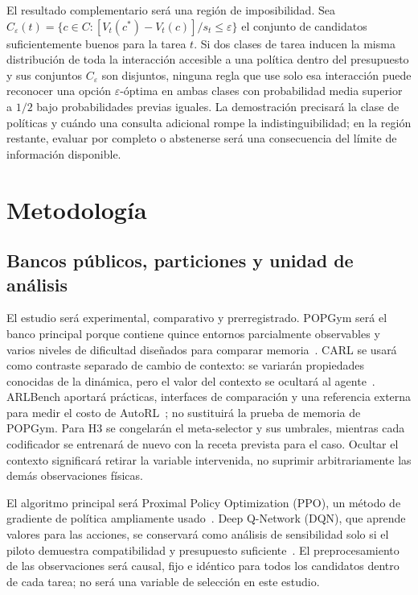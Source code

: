 \documentclass[11pt,letterpaper]{article}
\newcommand{\Vt}{V_t}
\newcommand{\cstar}{c^*}
\begin{document}
El resultado complementario será una región de imposibilidad.
Sea $C_{\varepsilon}(t)=\{c\in C:[\Vt(\cstar)-\Vt(c)]/s_t\leq\varepsilon\}$ el conjunto de candidatos suficientemente buenos para la tarea $t$.
Si dos clases de tarea inducen la misma distribución de toda la interacción accesible a una política dentro del presupuesto y sus conjuntos $C_{\varepsilon}$ son disjuntos, ninguna regla que use solo esa interacción puede reconocer una opción $\varepsilon$-óptima en ambas clases con probabilidad media superior a $1/2$ bajo probabilidades previas iguales.
La demostración precisará la clase de políticas y cuándo una consulta adicional rompe la indistinguibilidad; en la región restante, evaluar por completo o abstenerse será una consecuencia del límite de información disponible.

\section{Metodología}

\subsection{Bancos públicos, particiones y unidad de análisis}

El estudio será experimental, comparativo y prerregistrado.
POPGym será el banco principal porque contiene quince entornos parcialmente observables y varios niveles de dificultad diseñados para comparar memoria~\cite{morad2023popgym}.
CARL se usará como contraste separado de cambio de contexto: se variarán propiedades conocidas de la dinámica, pero el valor del contexto se ocultará al agente~\cite{benjamins2023carl}.
ARLBench aportará prácticas, interfaces de comparación y una referencia externa para medir el costo de AutoRL~\cite{becktepe2026arlbench}; no sustituirá la prueba de memoria de POPGym.
Para H3 se congelarán el meta-selector y sus umbrales, mientras cada codificador se entrenará de nuevo con la receta prevista para el caso.
Ocultar el contexto significará retirar la variable intervenida, no suprimir arbitrariamente las demás observaciones físicas.

El algoritmo principal será Proximal Policy Optimization (PPO), un método de gradiente de política ampliamente usado~\cite{schulman2017ppo}.
Deep Q-Network (DQN), que aprende valores para las acciones, se conservará como análisis de sensibilidad solo si el piloto demuestra compatibilidad y presupuesto suficiente~\cite{mnih2015dqn}.
El preprocesamiento de las observaciones será causal, fijo e idéntico para todos los candidatos dentro de cada tarea; no será una variable de selección en este estudio.
\end{document}
